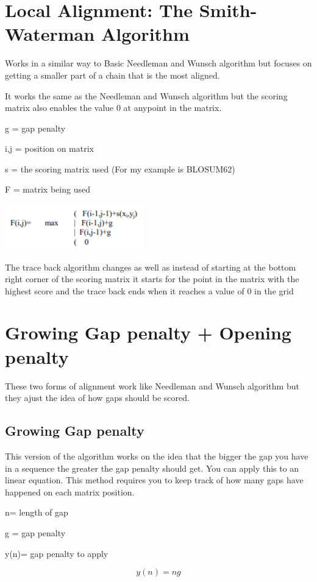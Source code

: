 \documentclass{cmppgr}
\begin{document}
	
	\section{Local Alignment: The Smith-Waterman Algorithm}
	
	Works in a similar way to Basic Needleman and Wunsch algorithm but focuses on getting a smaller part of a chain that is the most aligned.
	
	It works the same as the Needleman and Wunsch algorithm but the scoring matrix also enables the value 0 at anypoint in the matrix.
	
		g 	= gap penalty 
		
		i,j = position on matrix
		
		s	= the scoring matrix used (For my example is BLOSUM62)
		
		F	= matrix being used
	
	\includegraphics[width=6cm]{localAlginment.png}
	
	
	 The trace back algorithm changes as well as instead of starting at the bottom right corner of the scoring matrix it starts for the point in the matrix with the highest score and the trace back ends when it reaches a value of 0 in the grid
	
	\section{Growing Gap penalty + Opening penalty}
	These two forms of alignment work like Needleman and Wunsch algorithm but they ajust the idea of how gaps should be scored. 
	\subsection{Growing Gap penalty}
	This version of the algorithm works on the idea that the bigger the gap you have in a sequence the greater the gap penalty should get. You can apply this to an linear equation. This method requires you to keep track of how many gaps have happened on each matrix position.
	
	n= length of gap 
	
	g = gap penalty 
		
	y(n)= gap penalty to apply 
	
	\[ y(n) = ng \] 
	
\end{document}
